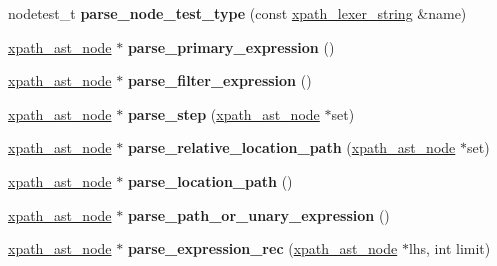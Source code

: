 \begin{DoxyCompactItemize}
\item 
\hypertarget{structxpath__parser_a7b4555d7bfdb90971333c46963d5d791}{}nodetest\+\_\+t {\bfseries parse\+\_\+node\+\_\+test\+\_\+type} (const \hyperlink{structxpath__lexer__string}{xpath\+\_\+lexer\+\_\+string} \&name)\label{structxpath__parser_a7b4555d7bfdb90971333c46963d5d791}

\item 
\hypertarget{structxpath__parser_a320728b83e426c4874066d633ffe65d9}{}\hyperlink{classxpath__ast__node}{xpath\+\_\+ast\+\_\+node} $\ast$ {\bfseries parse\+\_\+primary\+\_\+expression} ()\label{structxpath__parser_a320728b83e426c4874066d633ffe65d9}

\item 
\hypertarget{structxpath__parser_a0530aefc1445c4eac4614e895dd0a219}{}\hyperlink{classxpath__ast__node}{xpath\+\_\+ast\+\_\+node} $\ast$ {\bfseries parse\+\_\+filter\+\_\+expression} ()\label{structxpath__parser_a0530aefc1445c4eac4614e895dd0a219}

\item 
\hypertarget{structxpath__parser_a7daf146822e199d8ad564be25daa49db}{}\hyperlink{classxpath__ast__node}{xpath\+\_\+ast\+\_\+node} $\ast$ {\bfseries parse\+\_\+step} (\hyperlink{classxpath__ast__node}{xpath\+\_\+ast\+\_\+node} $\ast$set)\label{structxpath__parser_a7daf146822e199d8ad564be25daa49db}

\item 
\hypertarget{structxpath__parser_ab50d8b75f78b7e2eb77a1cf6872daa00}{}\hyperlink{classxpath__ast__node}{xpath\+\_\+ast\+\_\+node} $\ast$ {\bfseries parse\+\_\+relative\+\_\+location\+\_\+path} (\hyperlink{classxpath__ast__node}{xpath\+\_\+ast\+\_\+node} $\ast$set)\label{structxpath__parser_ab50d8b75f78b7e2eb77a1cf6872daa00}

\item 
\hypertarget{structxpath__parser_aae61a2931ba0b0c713b5d043f1cef6d4}{}\hyperlink{classxpath__ast__node}{xpath\+\_\+ast\+\_\+node} $\ast$ {\bfseries parse\+\_\+location\+\_\+path} ()\label{structxpath__parser_aae61a2931ba0b0c713b5d043f1cef6d4}

\item 
\hypertarget{structxpath__parser_a9f5cab421e931c46b0598ecec60c5591}{}\hyperlink{classxpath__ast__node}{xpath\+\_\+ast\+\_\+node} $\ast$ {\bfseries parse\+\_\+path\+\_\+or\+\_\+unary\+\_\+expression} ()\label{structxpath__parser_a9f5cab421e931c46b0598ecec60c5591}

\item 
\hypertarget{structxpath__parser_adfd2ab26b101a03ed79d7c3041539115}{}\hyperlink{classxpath__ast__node}{xpath\+\_\+ast\+\_\+node} $\ast$ {\bfseries parse\+\_\+expression\+\_\+rec} (\hyperlink{classxpath__ast__node}{xpath\+\_\+ast\+\_\+node} $\ast$lhs, int limit)\label{structxpath__parser_adfd2ab26b101a03ed79d7c3041539115}


\end{DoxyCompactItemize}
